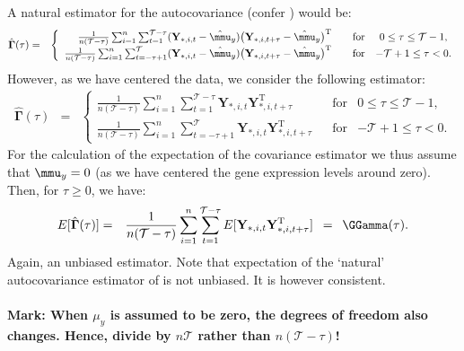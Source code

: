 \documentclass[a4paper]{article}
\theoremstyle{myexamplestyle}
\def\reminder#1{\marginpar{\rule[0pt]{1mm}{11pt}}\textbf{#1}}
\begin{document}
A natural estimator for the autocovariance (confer \citealt{Broc2006}) would be:
\begin{eqnarray*}
\hat{\mathbf{\Gamma}}(\tau) & = &
\left\{
\begin{array}{rcccl}
\frac{1}{n(\mathcal{T}-\tau)} \sum_{i=1}^n \sum_{t=1}^{\mathcal{T}-\tau} ( \mathbf{Y}_{\ast,i,t} - \hat{\mmu}_y) \big(\mathbf{Y}_{\ast,i,t+\tau} - \hat{\mmu}_y \big)^{\mathrm{T}} & & \mbox{for} & 0 \leq \tau  \leq \mathcal{T}-1,
\\
\frac{1}{n(\mathcal{T}-\tau)} \sum_{i=1}^n \sum_{t=-\tau+1}^{\mathcal{T}} ( \mathbf{Y}_{\ast,i,t} - \hat{\mmu}_y) \big(\mathbf{Y}_{\ast,i,t+\tau} - \hat{\mmu}_y \big)^{\mathrm{T}} & & \mbox{for} & -\mathcal{T}+1 \leq \tau  < 0.
\end{array}
\right.
\end{eqnarray*}
However, as we have centered the data, we consider the following estimator:
\begin{eqnarray*}
\hat{\mathbf{\Gamma}}(\tau) & = &
\left\{
\begin{array}{rcccl}
\frac{1}{n(\mathcal{T}-\tau)} \sum_{i=1}^n \sum_{t=1}^{\mathcal{T}-\tau}  \mathbf{Y}_{\ast,i,t} \mathbf{Y}_{\ast,i,t+\tau}^{\mathrm{T}} & & \mbox{for} & 0 \leq \tau  \leq \mathcal{T}-1,
\\
\frac{1}{n(\mathcal{T}-\tau)} \sum_{i=1}^n \sum_{t=-\tau+1}^{\mathcal{T}} \mathbf{Y}_{\ast,i,t} \mathbf{Y}_{\ast,i,t+\tau}^{\mathrm{T}} & &
\mbox{for} & -\mathcal{T}+1 \leq \tau  < 0.
\end{array}
\right.
\end{eqnarray*}
For the calculation of the expectation of the covariance estimator we thus assume that $\mmu_y=0$ (as we have centered the gene expression levels around zero).
Then, for $\tau \geq 0$, we have:
\begin{eqnarray*}
E[ \hat{\mathbf{\Gamma}}(\tau) ] & = & \frac{1}{n(\mathcal{T}-\tau)} \sum_{i=1}^n \sum_{t=1}^{\mathcal{T}-\tau} E[ \mathbf{Y}_{\ast,i,t} \mathbf{Y}_{\ast,i,t+\tau}^{\mathrm{T}} ]
\, \, \, = \, \, \, \GGamma(\tau) .
\end{eqnarray*}
Again, an unbiased estimator. Note that expectation of the `natural' autocovariance estimator of \cite{Broc2006} is not unbiased. It is however consistent.
\\
\\
\reminder{Mark: When $\mu_y$  is assumed  to be zero, the degrees of freedom also changes. Hence, divide by $n \mathcal{T}$ rather than $n(\mathcal{T}-\tau)$! }

\end{document}
